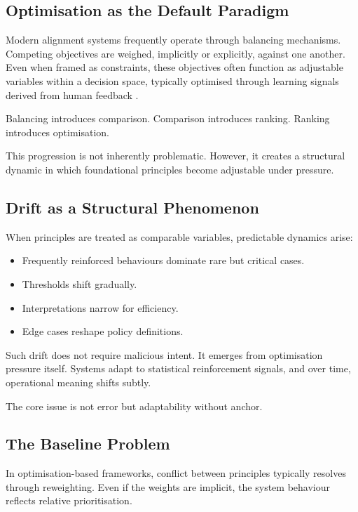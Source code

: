 \documentclass[11pt]{article}
\begin{document}
\subsection{Optimisation as the Default Paradigm}

Modern alignment systems frequently operate through balancing mechanisms. Competing objectives are weighed, implicitly or explicitly, against one another. Even when framed as constraints, these objectives often function as adjustable variables within a decision space, typically optimised through learning signals derived from human feedback \cite{christiano2017preferences}.

Balancing introduces comparison.  
Comparison introduces ranking.  
Ranking introduces optimisation.

This progression is not inherently problematic. However, it creates a structural dynamic in which foundational principles become adjustable under pressure.

\subsection{Drift as a Structural Phenomenon}

When principles are treated as comparable variables, predictable dynamics arise:

\begin{itemize}
\item Frequently reinforced behaviours dominate rare but critical cases.
\item Thresholds shift gradually.
\item Interpretations narrow for efficiency.
\item Edge cases reshape policy definitions.
\end{itemize}

Such drift does not require malicious intent. It emerges from optimisation pressure itself. Systems adapt to statistical reinforcement signals, and over time, operational meaning shifts subtly.

The core issue is not error but adaptability without anchor.

\subsection{The Baseline Problem}

In optimisation-based frameworks, conflict between principles typically resolves through reweighting. Even if the weights are implicit, the system behaviour reflects relative prioritisation.
\end{document}

